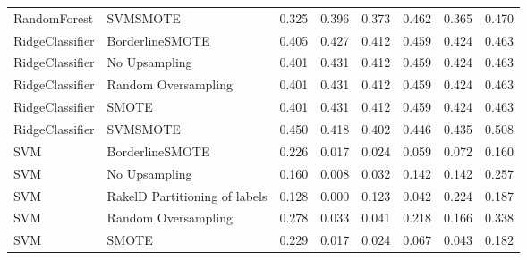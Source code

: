 \begin{tabular}{llllllll}
                   RandomForest &                      SVMSMOTE & 0.325 &                     0.396 &                 0.373 &                  0.462 &                                   0.365 &     0.470 \\
                RidgeClassifier &               BorderlineSMOTE & 0.405 &                     0.427 &                 0.412 &                  0.459 &                                   0.424 &     0.463 \\
                RidgeClassifier &                 No Upsampling & 0.401 &                     0.431 &                 0.412 &                  0.459 &                                   0.424 &     0.463 \\
                RidgeClassifier &           Random Oversampling & 0.401 &                     0.431 &                 0.412 &                  0.459 &                                   0.424 &     0.463 \\
                RidgeClassifier &                         SMOTE & 0.401 &                     0.431 &                 0.412 &                  0.459 &                                   0.424 &     0.463 \\
                RidgeClassifier &                      SVMSMOTE & 0.450 &                     0.418 &                 0.402 &                  0.446 &                                   0.435 &     0.508 \\
                            SVM &               BorderlineSMOTE & 0.226 &                     0.017 &                 0.024 &                  0.059 &                                   0.072 &     0.160 \\
                            SVM &                 No Upsampling & 0.160 &                     0.008 &                 0.032 &                  0.142 &                                   0.142 &     0.257 \\
                            SVM & RakelD Partitioning of labels & 0.128 &                     0.000 &                 0.123 &                  0.042 &                                   0.224 &     0.187 \\
                            SVM &           Random Oversampling & 0.278 &                     0.033 &                 0.041 &                  0.218 &                                   0.166 &     0.338 \\
                            SVM &                         SMOTE & 0.229 &                     0.017 &                 0.024 &                  0.067 &                                   0.043 &     0.182 \\

\end{tabular}
